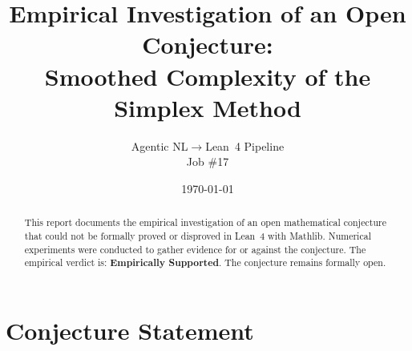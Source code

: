 \documentclass[11pt]{article}
\title{Empirical Investigation of an Open Conjecture:\\
Smoothed Complexity of the Simplex Method}
\author{Agentic NL$\to$Lean~4 Pipeline \\ \small Job \#17}
\date{\today}
\begin{document}
\maketitle

\begin{abstract}
This report documents the empirical investigation of an open mathematical conjecture
that could not be formally proved or disproved in Lean~4 with Mathlib.
Numerical experiments were conducted to gather evidence for or against the conjecture.
The empirical verdict is: \textbf{\textcolor{green!70!black}{Empirically Supported}}.
The conjecture remains formally open.
\end{abstract}

\section{Conjecture Statement}
\end{document}
